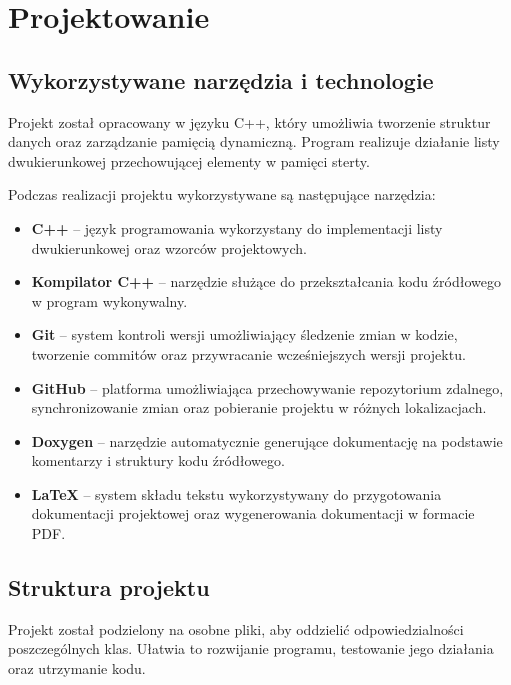 \newpage
\section{Projektowanie}

\subsection{Wykorzystywane narzędzia i technologie}

Projekt został opracowany w języku C++, który umożliwia tworzenie
struktur danych oraz zarządzanie pamięcią dynamiczną. Program
realizuje działanie listy dwukierunkowej przechowującej elementy
w pamięci sterty.

Podczas realizacji projektu wykorzystywane są następujące narzędzia:

\begin{itemize}
    \item \textbf{C++} -- język programowania wykorzystany do
    implementacji listy dwukierunkowej oraz wzorców projektowych.

    \item \textbf{Kompilator C++} -- narzędzie służące do
    przekształcania kodu źródłowego w program wykonywalny.

    \item \textbf{Git} -- system kontroli wersji umożliwiający
    śledzenie zmian w kodzie, tworzenie commitów oraz przywracanie
    wcześniejszych wersji projektu.

    \item \textbf{GitHub} -- platforma umożliwiająca
    przechowywanie repozytorium zdalnego, synchronizowanie zmian
    oraz pobieranie projektu w różnych lokalizacjach.

    \item \textbf{Doxygen} -- narzędzie automatycznie generujące
    dokumentację na podstawie komentarzy i struktury kodu źródłowego.

    \item \textbf{LaTeX} -- system składu tekstu wykorzystywany do
    przygotowania dokumentacji projektowej oraz wygenerowania
    dokumentacji w formacie PDF.
\end{itemize}

\subsection{Struktura projektu}

Projekt został podzielony na osobne pliki, aby oddzielić
odpowiedzialności poszczególnych klas. Ułatwia to rozwijanie
programu, testowanie jego działania oraz utrzymanie kodu.

